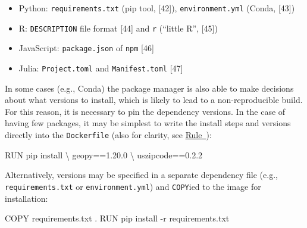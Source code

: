 \documentclass[10pt,letterpaper]{article}
\newenvironment{Shaded}{\begin{snugshade}}{\end{snugshade}}
\newcommand{\ExtensionTok}[1]{#1}
\newcommand{\NormalTok}[1]{#1}
\providecommand{\tightlist}{%
  \setlength{\itemsep}{0pt}\setlength{\parskip}{0pt}}
\begin{document}
\begin{itemize}
\tightlist
\item
  Python: \texttt{requirements.txt} (pip tool, {[}42{]}),
  \texttt{environment.yml} (Conda, {[}43{]})
\item
  R: \texttt{DESCRIPTION} file format {[}44{]} and \texttt{r} (``little
  R'', {[}45{]})
\item
  JavaScript: \texttt{package.json} of \texttt{npm} {[}46{]}
\item
  Julia: \texttt{Project.toml} and \texttt{Manifest.toml} {[}47{]}
\end{itemize}

In some cases (e.g., Conda) the package manager is also able to make
decisions about what versions to install, which is likely to lead to a
non-reproducible build. For this reason, it is necessary to pin the
dependency versions. In the case of having few packages, it may be
simplest to write the install steps and versions directly into the
\texttt{Dockerfile} (also for clarity, see
\hyperref[{rule:clarity}]{Rule~}):

\footnotesize

\begin{Shaded}
\begin{Highlighting}[]
\ExtensionTok{RUN}\NormalTok{ pip install \textbackslash{}}
\NormalTok{  geopy==1.20.0 \textbackslash{}}
\NormalTok{  uszipcode==0.2.2}
\end{Highlighting}
\end{Shaded}

\normalsize

Alternatively, versions may be specified in a separate dependency file
(e.g., \texttt{requirements.txt} or \texttt{environment.yml}) and
\texttt{COPY}ied to the image for installation:

\footnotesize

\begin{Shaded}
\begin{Highlighting}[]
\ExtensionTok{COPY}\NormalTok{ requirements.txt .}
\ExtensionTok{RUN}\NormalTok{ pip install -r requirements.txt}
\end{Highlighting}
\end{Shaded}

\normalsize
\end{document}
